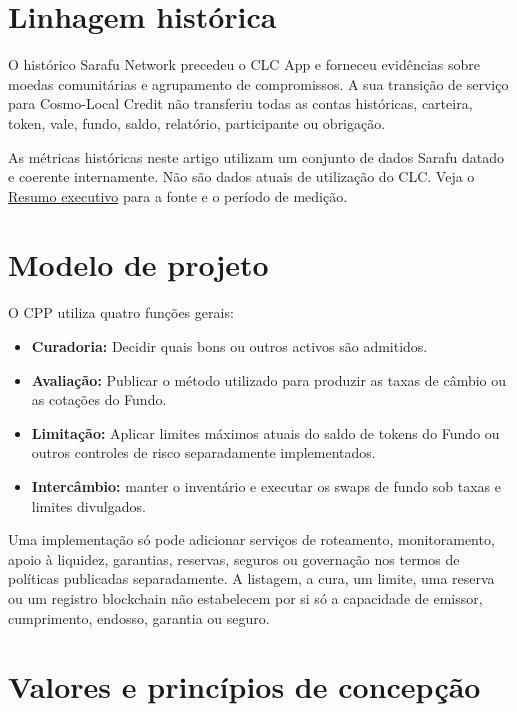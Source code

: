 \documentclass[11pt]{article}
\begin{document}
\section*{Linhagem histórica}

O histórico Sarafu Network precedeu o CLC App e forneceu evidências sobre moedas comunitárias e agrupamento de compromissos. A sua transição de serviço para Cosmo-Local Credit não transferiu todas as contas históricas, carteira, token, vale, fundo, saldo, relatório, participante ou obrigação.

As métricas históricas neste artigo utilizam um conjunto de dados Sarafu datado e coerente internamente. Não são dados atuais de utilização do CLC. Veja o \href{https://docs.cosmolocal.credit/pt/white-paper/executive-summary}{Resumo executivo} para a fonte e o período de medição.

\section*{Modelo de projeto}

O CPP utiliza quatro funções gerais:

\begin{itemize}[leftmargin=*]
\item \textbf{Curadoria:} Decidir quais bons ou outros activos são admitidos.
\item \textbf{Avaliação:} Publicar o método utilizado para produzir as taxas de câmbio ou as cotações do Fundo.
\item \textbf{Limitação:} Aplicar limites máximos atuais do saldo de tokens do Fundo ou outros controles de risco separadamente implementados.
\item \textbf{Intercâmbio:} manter o inventário e executar os swaps de fundo sob taxas e limites divulgados.
\end{itemize}
Uma implementação só pode adicionar serviços de roteamento, monitoramento, apoio à liquidez, garantias, reservas, seguros ou governação nos termos de políticas publicadas separadamente. A listagem, a cura, um limite, uma reserva ou um registro blockchain não estabelecem por si só a capacidade de emissor, cumprimento, endosso, garantia ou seguro.

\section*{Valores e princípios de concepção}
\end{document}
